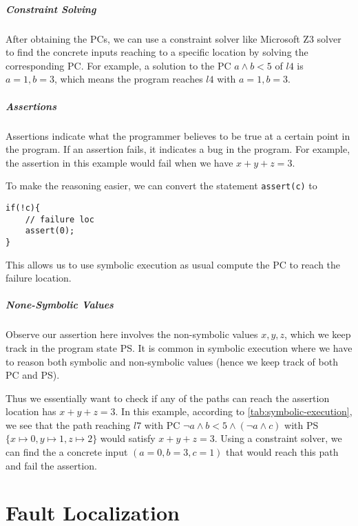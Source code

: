 \documentclass[oneside,11pt,dvipsnames]{book}
\newcommand{\code}[1]{\texttt{#1}}
\begin{document}
\paragraph{Constraint Solving} 
After obtaining the PCs, we can use a constraint solver like Microsoft Z3 solver to find the concrete inputs reaching to a specific location by solving the corresponding PC. For example, a solution to the PC $a \land b < 5$ of $l4$ is $a=1, b=3$, which means the program reaches $l4$ with $a=1, b=3$.

\paragraph{Assertions} Assertions indicate what the programmer believes to be true at a certain point in the program. If an assertion fails, it indicates a bug in the program. For example, the assertion in this example would fail when we have $x + y + z = 3$.

To make the reasoning easier, we can convert the statement \code{assert(c)} to 
\begin{lstlisting}
if(!c){
    // failure loc
    assert(0);
}
\end{lstlisting}

This allows us to use symbolic execution as usual compute the PC to reach the failure location. 

\paragraph{None-Symbolic Values} Observe our assertion here involves the non-symbolic values $x, y, z$, which we keep track in the program state PS. It is common in symbolic execution where we have to reason both symbolic and non-symbolic values (hence we keep track of both PC and PS).

Thus we essentially want to check if any of the paths can reach the assertion location has $x + y + z = 3$. In this example, according to \autoref{tab:symbolic-execution}, we see that the path reaching $l7$ with PC $\lnot a \land b < 5 \land (\lnot a \land c)$ with PS $\{x\mapsto 0, y \mapsto 1, z \mapsto2\}$ would satisfy $x + y + z = 3$. Using a constraint solver, we can find the a concrete input $(a=0, b=3, c = 1)$ that would reach this path and fail the assertion.





\chapter{Fault Localization}\label{sec:debugging}
\end{document}
